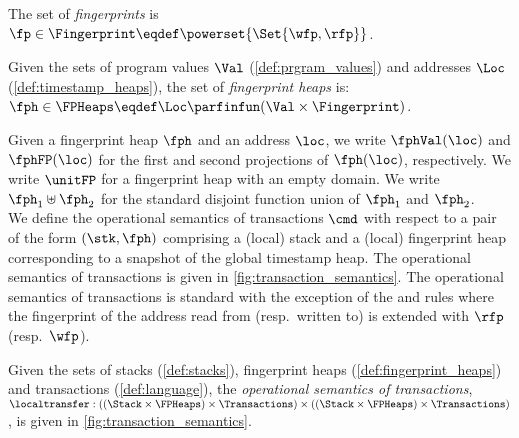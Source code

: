 \begin{definition}\label{def:fingerprint_heaps}
The set of \emph{fingerprints} is $\fp \in \Fingerprint \eqdef \powerset{\Set{\wfp,\rfp}}$.

\noindent Given the sets of program values $\Val$ (\ref{def:prgram_values}) and addresses $\Loc$ (\ref{def:timestamp_heaps}), the set of \emph{fingerprint heaps} is: $\fph \in \FPHeaps \eqdef \Loc \parfinfun (\Val \times \Fingerprint)$.
\end{definition}
%
Given a fingerprint heap $\fph$ and an address $\loc$, we write $\fphVal(\loc)$ and $\fphFP(\loc)$ for the first and second projections of $\fph(\loc)$, respectively. We write $\unitFP$ for a fingerprint heap with an empty domain. We write $\fph_1 \uplus \fph_2$ for the standard disjoint function union of $\fph_1$ and $\fph_2$.\\

We define the operational semantics of transactions $\cmd$ with respect to a pair of the form $(\stk, \fph)$ comprising a (local) stack and a (local) fingerprint heap corresponding to a snapshot of the global timestamp heap. The operational semantics of transactions is given in \fig\ref{fig:transaction_semantics}.
The operational semantics of transactions is standard with the exception of the  and  rules where the fingerprint of the address read from (resp.~written to) is extended with $\rfp$ (resp.~$\wfp$).



\begin{definition}
Given the sets of stacks (\ref{def:stacks}), fingerprint heaps (\ref{def:fingerprint_heaps}) and transactions (\ref{def:language}), the \emph{operational semantics of transactions}, $\localtransfer : ((\Stack \times \FPHeaps) \times \Transactions) \times ((\Stack \times \FPHeaps) \times \Transactions)$, is given in \fig\ref{fig:transaction_semantics}.
\end{definition}

